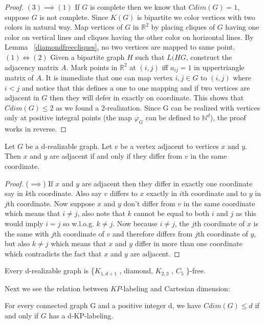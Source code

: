 \documentclass[12pt,a4paper,titlepage,openany]{report}
\begin{document}
\begin{proof}
$(3)\implies (1)$ If $G$ is complete then we know that $Cdim(G)=1$, suppose $G$ is not complete. Since $K(G)$ is bipartite we color vertices with two colors in natural way. Map vertices of $G$ in $\mathbb{R}^2$ by placing cliques of $G$ having one color on vertical lines and cliques having the other color on horizontal lines. By Lemma ~\ref{diamondfreecliques}, no two vertices are mapped to same point.
\newline
$(1)\iff (2)$ Given a bipartite graph $H$ such that $L(HG$, construct the adjacency matrix $A$. Mark points in $\mathbb{R}^2$ at $(i, j)$ iff $a_{ij} = 1$ in uppertriangle matrix of $A$. It is immediate that one can map vertex ${i,j}\in G$ to $(i,j)$ where $i<j$ and notice that this defines a one to one mapping and if two vertices are adjacent in $G$ then they will defer in exactly on coordinate. This shows that $Cdim(G)\leq 2$ as we found a $2$-realization.\newline
Since G can be realized with vertices only at positive integral points (the map $\varphi_G$ can be defined to $\mathbb{N}^d$), the proof works in reverse.
\end{proof}

\begin{lemma}
Let $G$ be a d-realizable graph. Let $v$ be a vertex adjacent to vertices $x$ and $y$. Then $x$ and $y$ are adjacent if and only if they differ from $v$ in the same coordinate.
\end{lemma}
\begin{proof}
($\implies$) If $x$ and $y$ are adjacent then they differ in exactly one coordinate say in $k$th coordinate. Also say $v$ differs to $x$ exactly in $i$th coordinate and to $y$ in $j$th coordinate. Now suppose $x$ and $y$ don't differ from $v$ in the same coordinate which means that $i\neq j$, also note that $k$ cannot be equal to both $i$ and $j$ as this would imply $i=j$ so w.l.o.g. $k\neq j$. Now because $i\neq j$, the $j$th coordinate of $x$ is the same with $j$th coordinate of $v$ and therefore differs from $j$th coordinate of $y$, but also $k\neq j$ which means that $x$ and $y$ differ in more than one coordinate which contradicts the fact that $x$ and $y$ are adjacent. 
\end{proof}

\begin{theorem}
Every d-realizable graph is \{$K_{1,d+1}$ , diamond,
$K_{2,3}$ , $C_5$ \}-free.
\end{theorem} 

Next we see the relation between $KP$-labeling and Cartesian dimension:
 \begin{theorem}
For every connected graph G and a positive integer d, we have $Cdim(G) \leq d$ if and only if $G$ has a d-KP-labeling.
\end{theorem}
\end{document}
